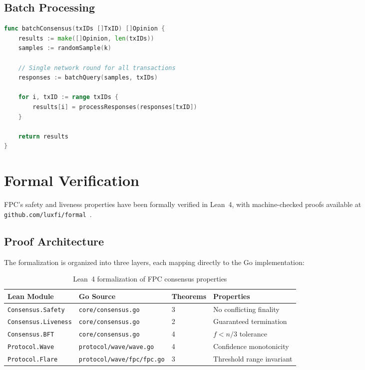 \documentclass[11pt,a4paper]{article}
\begin{document}
\subsection{Batch Processing}

\begin{lstlisting}[language=Go, caption=Batch consensus for multiple transactions]
func batchConsensus(txIDs []TxID) []Opinion {
    results := make([]Opinion, len(txIDs))
    samples := randomSample(k)
    
    // Single network round for all transactions
    responses := batchQuery(samples, txIDs)
    
    for i, txID := range txIDs {
        results[i] = processResponses(responses[txID])
    }
    
    return results
}
\end{lstlisting}

\section{Formal Verification}
\label{sec:formal}

FPC's safety and liveness properties have been formally verified in Lean~4, with machine-checked proofs available at \texttt{github.com/luxfi/formal}~\cite{luxformal2025}.

\subsection{Proof Architecture}

The formalization is organized into three layers, each mapping directly to the Go implementation:

\begin{table}[h]
\centering
\begin{tabular}{llll}
\toprule
\textbf{Lean Module} & \textbf{Go Source} & \textbf{Theorems} & \textbf{Properties} \\
\midrule
\texttt{Consensus.Safety} & \texttt{core/consensus.go} & 3 & No conflicting finality \\
\texttt{Consensus.Liveness} & \texttt{core/consensus.go} & 2 & Guaranteed termination \\
\texttt{Consensus.BFT} & \texttt{core/consensus.go} & 4 & $f < n/3$ tolerance \\
\texttt{Protocol.Wave} & \texttt{protocol/wave/wave.go} & 4 & Confidence monotonicity \\
\texttt{Protocol.Flare} & \texttt{protocol/wave/fpc/fpc.go} & 3 & Threshold range invariant \\
\bottomrule
\end{tabular}
\caption{Lean~4 formalization of FPC consensus properties}
\label{tab:formal}
\end{table}
\end{document}
